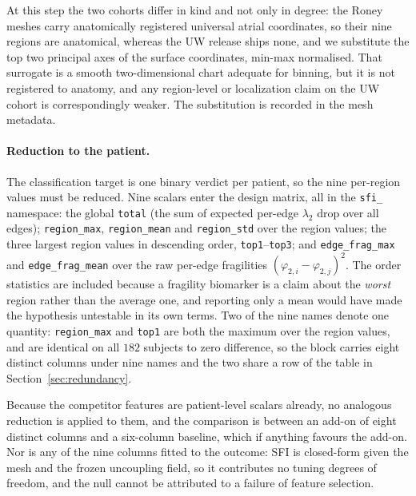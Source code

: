 \documentclass[11pt]{article}
\theoremstyle{definition}
\newcommand{\lam}{\lambda}
\newcommand{\phii}{\varphi}
\newcommand{\code}[1]{\texttt{#1}}
\begin{document}
At this step the two cohorts differ in kind and not only in degree: the Roney
meshes carry anatomically registered universal atrial coordinates, so their nine
regions are anatomical, whereas the UW release ships none, and we substitute the
top two principal axes of the surface coordinates, min-max normalised. That
surrogate is a smooth two-dimensional chart adequate for binning, but it is not
registered to anatomy, and any region-level or localization claim on the UW
cohort is correspondingly weaker. The substitution is recorded in the mesh
metadata.

\paragraph{Reduction to the patient.} The classification target is one binary
verdict per patient, so the nine per-region values must be reduced. Nine scalars
enter the design matrix, all in the \code{sfi\_} namespace: the global
\code{total} (the sum of expected per-edge $\lam_2$ drop over all edges);
\code{region\_max}, \code{region\_mean} and \code{region\_std} over the region
values; the three largest region values in descending order,
\code{top1}--\code{top3}; and \code{edge\_frag\_max} and \code{edge\_frag\_mean}
over the raw per-edge fragilities $(\phii_{2,i}-\phii_{2,j})^2$. The order
statistics are included because a fragility biomarker is a claim about the
\emph{worst} region rather than the average one, and reporting only a mean would
have made the hypothesis untestable in its own terms. Two of the nine names
denote one quantity: \code{region\_max} and \code{top1} are both the maximum over
the region values, and are identical on all $182$ subjects to zero difference, so
the block carries eight distinct columns under nine names and the two share a row
of the table in Section~\ref{sec:redundancy}.

Because the competitor features are patient-level scalars already, no analogous
reduction is applied to them, and the comparison is between an add-on of eight
distinct columns and a six-column baseline, which if anything favours the add-on.
Nor is any of the nine columns fitted to the outcome: SFI is closed-form given
the mesh and the frozen uncoupling field, so it contributes no tuning degrees of
freedom, and the null cannot be attributed to a failure of feature selection.
\end{document}
